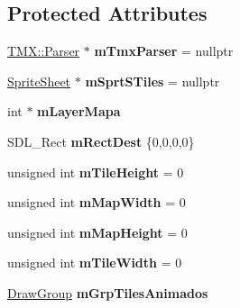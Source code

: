 \subsection*{Protected Attributes}
\begin{DoxyCompactItemize}
\item 
\hyperlink{class_t_m_x_1_1_parser}{T\+M\+X\+::\+Parser} $\ast$ {\bfseries m\+Tmx\+Parser} = nullptr\hypertarget{class_mapa_aa1930968e5c377c8c256f63c1e4d6301}{}\label{class_mapa_aa1930968e5c377c8c256f63c1e4d6301}

\item 
\hyperlink{class_sprite_sheet}{Sprite\+Sheet} $\ast$ {\bfseries m\+Sprt\+S\+Tiles} = nullptr\hypertarget{class_mapa_a8967581c875d0a6c070251d9b66345db}{}\label{class_mapa_a8967581c875d0a6c070251d9b66345db}

\item 
int $\ast$ {\bfseries m\+Layer\+Mapa}\hypertarget{class_mapa_a8ee1595b26f941cff5d8ff0474d202f2}{}\label{class_mapa_a8ee1595b26f941cff5d8ff0474d202f2}

\item 
S\+D\+L\+\_\+\+Rect {\bfseries m\+Rect\+Dest} \{0,0,0,0\}\hypertarget{class_mapa_a8d98267cf15cc550f25db96d441c6201}{}\label{class_mapa_a8d98267cf15cc550f25db96d441c6201}

\item 
unsigned int {\bfseries m\+Tile\+Height} = 0\hypertarget{class_mapa_a38c77f72272f53e38cf355c988e5eaa6}{}\label{class_mapa_a38c77f72272f53e38cf355c988e5eaa6}

\item 
unsigned int {\bfseries m\+Map\+Width} = 0\hypertarget{class_mapa_ac2c8daa280f568a6d78c4641eedec9d9}{}\label{class_mapa_ac2c8daa280f568a6d78c4641eedec9d9}

\item 
unsigned int {\bfseries m\+Map\+Height} = 0\hypertarget{class_mapa_a1a7fd0909905efb7f890e98baffde43c}{}\label{class_mapa_a1a7fd0909905efb7f890e98baffde43c}

\item 
unsigned int {\bfseries m\+Tile\+Width} = 0\hypertarget{class_mapa_a4db442f40a4972f78726b04dbb259e02}{}\label{class_mapa_a4db442f40a4972f78726b04dbb259e02}

\item 
\hyperlink{class_draw_group}{Draw\+Group} {\bfseries m\+Grp\+Tiles\+Animados}\hypertarget{class_mapa_af73f2d6413457cd0c82be76ce5050d85}{}\label{class_mapa_af73f2d6413457cd0c82be76ce5050d85}

\end{DoxyCompactItemize}


